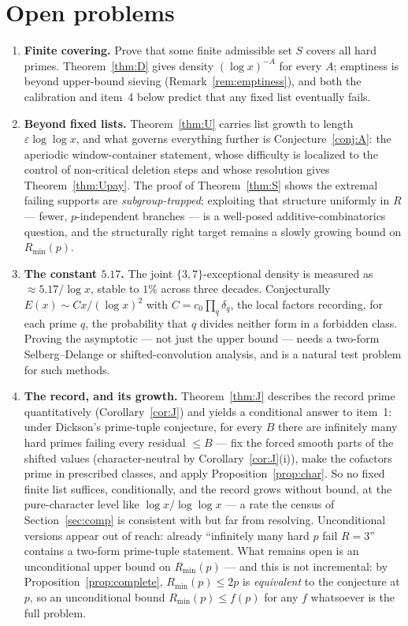 \documentclass[11pt]{article}
\theoremstyle{plain}
\theoremstyle{remark}
\theoremstyle{plain}
\numberwithin{equation}{section}
\begin{document}
\section{Open problems}\label{sec:open}

\begin{enumerate}
\item \textbf{Finite covering.} Prove that some finite admissible set
  $S$ covers all hard primes. Theorem~\ref{thm:D} gives density
  $(\log x)^{-A}$ for every $A$; emptiness is beyond upper-bound
  sieving (Remark~\ref{rem:emptiness}), and both the calibration and
  item~4 below predict that any fixed list eventually fails.
\item \textbf{Beyond fixed lists.} Theorem~\ref{thm:U} carries list
  growth to length $\varepsilon\log\log x$, and what governs
  everything further is Conjecture~\ref{conj:A}: the aperiodic
  window-container statement, whose difficulty is localized to the
  control of non-critical deletion steps and whose resolution gives
  Theorem~\ref{thm:Upay}. The proof of Theorem~\ref{thm:S} shows the
  extremal failing supports are \emph{subgroup-trapped}; exploiting
  that structure uniformly in $R$ --- fewer, $p$-independent branches
  --- is a well-posed additive-combinatorics question, and the
  structurally right target remains a slowly growing bound on
  $R_{\min}(p)$.
\item \textbf{The constant \boldmath$5.17$.} The joint
  $\{3,7\}$-exceptional density is measured as $\approx 5.17/\log x$,
  stable to $1\%$ across three decades. Conjecturally
  $E(x) \sim C x/(\log x)^2$ with $C = c_0 \prod_q \delta_q$, the
  local factors recording, for each prime $q$, the probability that
  $q$ divides neither form in a forbidden class. Proving the
  asymptotic --- not just the upper bound --- needs a two-form
  Selberg--Delange or shifted-convolution analysis, and is a natural
  test problem for such methods.
\item \textbf{The record, and its growth.} Theorem~\ref{thm:J}
  describes the record prime quantitatively
  (Corollary~\ref{cor:J}) and yields a conditional answer to item~1:
  under Dickson's prime-tuple conjecture, for every $B$ there are
  infinitely many hard primes failing every residual $\le B$ --- fix
  the forced smooth parts of the shifted values (character-neutral by
  Corollary~\ref{cor:J}(i)), make the cofactors prime in prescribed
  classes, and apply Proposition~\ref{prop:char}. So no fixed finite
  list suffices, conditionally, and the record grows without bound, at
  the pure-character level like $\log x/\log\log x$ --- a rate the
  census of Section~\ref{sec:comp} is consistent with but far from
  resolving. Unconditional versions appear out of reach: already
  ``infinitely many hard $p$ fail $R = 3$'' contains a two-form
  prime-tuple statement. What remains open is an unconditional upper
  bound on $R_{\min}(p)$ --- and this is not incremental: by
  Proposition~\ref{prop:complete}, $R_{\min}(p) \le 2p$ is
  \emph{equivalent} to the conjecture at $p$, so an unconditional
  bound $R_{\min}(p) \le f(p)$ for any $f$ whatsoever is the full
  problem.
\end{enumerate}
\end{document}

